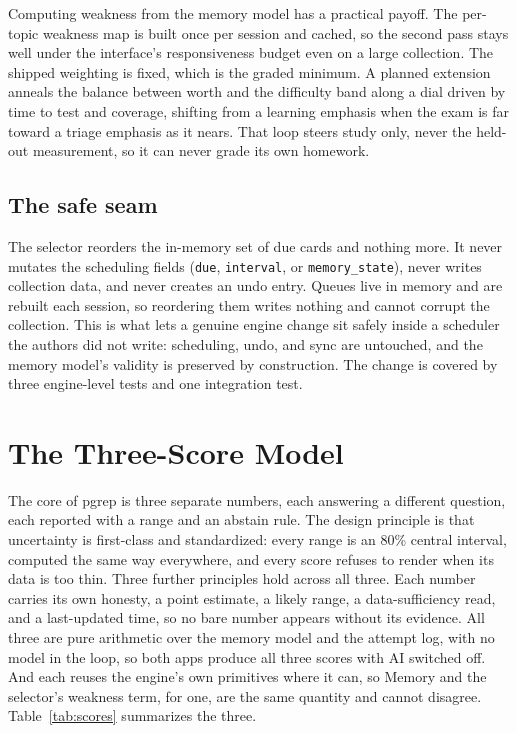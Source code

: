 \documentclass[11pt]{article}
\begin{document}
Computing weakness from the memory model has a practical payoff. The per-topic weakness
map is built once per session and cached, so the second pass stays well under the
interface's responsiveness budget even on a large collection. The shipped weighting is
fixed, which is the graded minimum. A planned extension anneals the balance between
worth and the difficulty band along a dial driven by time to test and coverage,
shifting from a learning emphasis when the exam is far toward a triage emphasis as it
nears. That loop steers study only, never the held-out measurement, so it can never
grade its own homework.

\subsection{The safe seam}

The selector reorders the in-memory set of due cards and nothing more. It never
mutates the scheduling fields (\texttt{due}, \texttt{interval}, or
\texttt{memory\_state}), never writes collection data, and never creates an undo
entry. Queues live in memory and are rebuilt each session, so reordering them writes
nothing and cannot corrupt the collection. This is what lets a genuine engine change
sit safely inside a scheduler the authors did not write: scheduling, undo, and sync
are untouched, and the memory model's validity is preserved by construction. The
change is covered by three engine-level tests and one integration test.

\section{The Three-Score Model}

The core of pgrep is three separate numbers, each answering a different question,
each reported with a range and an abstain rule. The design principle is that
uncertainty is first-class and standardized: every range is an 80\% central interval,
computed the same way everywhere, and every score refuses to render when its data is
too thin. Three further principles hold across all three. Each number carries its own
honesty, a point estimate, a likely range, a data-sufficiency read, and a last-updated
time, so no bare number appears without its evidence. All three are pure arithmetic over
the memory model and the attempt log, with no model in the loop, so both apps produce
all three scores with AI switched off. And each reuses the engine's own primitives where
it can, so Memory and the selector's weakness term, for one, are the same quantity and
cannot disagree. Table~\ref{tab:scores} summarizes the three.
\end{document}
